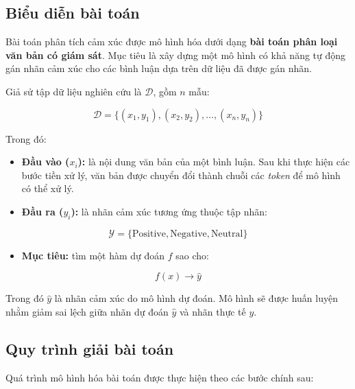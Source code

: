 \documentclass[14pt, a4paper]{report}
\begin{document}
\subsection{Biểu diễn bài toán}

Bài toán phân tích cảm xúc được mô hình hóa dưới dạng \textbf{bài toán phân loại văn bản có giám sát}. Mục tiêu là xây dựng một mô hình có khả năng tự động gán nhãn cảm xúc cho các bình luận dựa trên dữ liệu đã được gán nhãn.

Giả sử tập dữ liệu nghiên cứu là $\mathcal{D}$, gồm $n$ mẫu:

\begin{equation}
\mathcal{D} = \{ (x_1, y_1), (x_2, y_2), \ldots, (x_n, y_n) \}
\end{equation}

Trong đó:

\begin{itemize}
    \item \textbf{Đầu vào ($x_i$):} là nội dung văn bản của một bình luận. Sau khi thực hiện các bước tiền xử lý, văn bản được chuyển đổi thành chuỗi các \textit{token} để mô hình có thể xử lý.
    \item \textbf{Đầu ra ($y_i$):} là nhãn cảm xúc tương ứng thuộc tập nhãn:
\end{itemize}

\begin{equation}
\mathcal{Y} = \{ \text{Positive}, \text{Negative}, \text{Neutral} \}
\end{equation}

\begin{itemize}
    \item \textbf{Mục tiêu:} tìm một hàm dự đoán $f$ sao cho:
\end{itemize}

\begin{equation}
f(x) \rightarrow \hat{y}
\end{equation}

Trong đó $\hat{y}$ là nhãn cảm xúc do mô hình dự đoán. Mô hình sẽ được huấn luyện nhằm giảm sai lệch giữa nhãn dự đoán $\hat{y}$ và nhãn thực tế $y$.

\subsection{Quy trình giải bài toán}

Quá trình mô hình hóa bài toán được thực hiện theo các bước chính sau:
\end{document}
